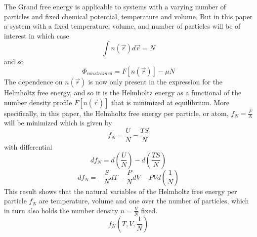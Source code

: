 \documentclass[double,12pt]{beavtex}
\begin{document}
The Grand free energy is applicable to systems with a varying number of particles and fixed chemical potential, temperature and volume. But in this paper a system with a fixed temperature, volume, and number of particles will be of interest in which case
\begin{equation}\int n(\vec r)d\vec{r}=N\end{equation}
and so 
\begin{equation}\label{GrandFE}\Phi_{constrained}= F[n(\vec r)]-\mu N\end{equation}
The dependence on $n(\vec r)$ is now only present in the expression for the Helmholtz free energy, and so it is the Helmholtz energy as a functional of the number density profile $F[n(\vec r)]$ that is minimized at equilibrium. 
More specifically, in this paper, the Helmholtz free energy per particle, or atom,  $f_N=\frac{F}{N}$ will be minimized which is given by
\begin{equation}f_N=\frac{U}{N}-\frac{TS}{N}\end{equation}
with differential
\begin{equation}\label{usetoshowmin}df_N=d\left(\frac{U}{N}\right)-d\left(\frac{TS}{N}\right)\end{equation}
\begin{equation}df_N=-\frac{S}{N}dT-\frac{P}{N}dV-PVd\left(\frac{1}{N}\right)\end{equation}
This result shows that the natural variables of the Helmholtz free energy per particle $f_N$ are temperature, volume and one over the number of particles, which in turn also holds the number density $n=\frac{V}{N}$ fixed. 
\begin{equation}f_N(T,V, \frac{1}{N})\end{equation}
 
\end{document}
